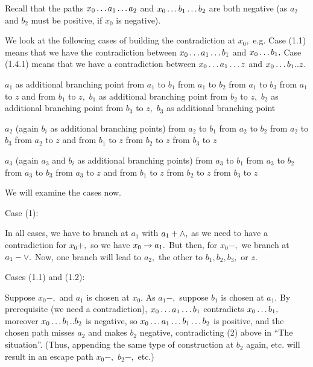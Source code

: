 Recall that the paths $x_{0} \ldots a_{1} \ldots a_{2}$ and $x_{0} \ldots b_{1} \ldots
b_{2}$ are both negative
(as $a_{2}$ and $b_{2}$ must be positive, if $x_{0}$ is negative).

We look at the following cases of building the contradiction at $x_{0},$
e.g. Case (1.1) means that we have the contradiction between
$x_{0} \ldots a_{1} \ldots b_{1}$ and $x_{0} \ldots b_{1},$
Case (1.4.1) means that we have a contradiction between
$x_{0} \ldots a_{1} \ldots z$ and $x_{0} \ldots b_{1}..z$.

 \xEh

 \xDH $a_{1}$ as additional branching point
 \xEh
 \xDH from $a_{1}$ to $b_{1}$
 \xDH from $a_{1}$ to $b_{2}$
 \xDH from $a_{1}$ to $b_{3}$
 \xDH from $a_{1}$ to $z$ and
 \xEh
 \xDH from $b_{1}$ to $z,$ $b_{1}$ as additional branching point
 \xDH from $b_{2}$ to $z,$ $b_{2}$ as additional branching point
 \xDH from $b_{3}$ to $z,$ $b_{3}$ as additional branching point
 \xEj
 \xEj

 \xDH $a_{2}$ (again $b_{i}$ as additional branching points)
 \xEh
 \xDH from $a_{2}$ to $b_{1}$
 \xDH from $a_{2}$ to $b_{2}$
 \xDH from $a_{2}$ to $b_{3}$
 \xDH from $a_{2}$ to $z$ and
 \xEh
 \xDH from $b_{1}$ to $z$
 \xDH from $b_{2}$ to $z$
 \xDH from $b_{3}$ to $z$
 \xEj
 \xEj

 \xDH $a_{3}$ (again $a_{3}$ and $b_{i}$ as additional branching points)
 \xEh
 \xDH from $a_{3}$ to $b_{1}$
 \xDH from $a_{3}$ to $b_{2}$
 \xDH from $a_{3}$ to $b_{3}$
 \xDH from $a_{3}$ to $z$ and
 \xEh
 \xDH from $b_{1}$ to $z$
 \xDH from $b_{2}$ to $z$
 \xDH from $b_{3}$ to $z$
 \xEj

 \xEj

 \xEj

We will examine the cases now.

 \xEh

 \xDH Case (1):

In all cases, we have to branch at $a_{1}$ with $a_{1}+ \wedge,$
as we need to have a contradiction for $x_{0}+,$ so we have $x_{0} \rightarrow
a_{1}.$
But then, for $x_{0}-,$ we branch at $a_{1}- \vee.$ Now, one branch will
lead to $a_{2},$
the other to $b_{1},b_{2},b_{3},$ or $z.$

Cases (1.1) and (1.2):

Suppose $x_{0}-,$ and $a_{1}$ is chosen at $x_{0}.$ As $a_{1}-,$ suppose
$b_{1}$ is chosen at $a_{1}.$
By prerequisite (we need a contradiction),
$x_{0} \ldots a_{1} \ldots b_{1}$ contradicts $x_{0} \ldots b_{1},$ moreover $x_{0}
\ldots b_{1}..b_{2}$ is
negative, so $x_{0} \ldots a_{1} \ldots b_{1} \ldots b_{2}$ is positive, and the
chosen path misses
$a_{2}$ and makes $b_{2}$ negative, contradicting (2) above in ``The
situation''.
(Thus, appending the same type of construction at $b_{2}$ again,
etc. will result in an escape path $x_{0}-,$ $b_{2}-,$ etc.)

